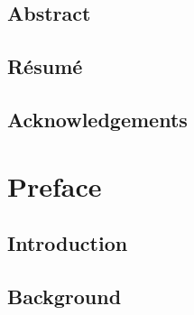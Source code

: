 \documentclass{style/umemoir}
\author{First Name LAST NAME} %
\begin{document}

\MyTitlePage

\frontmatter %








\chapter*{Abstract}


\chapter*{R\'esum\'e}



\chapter*{Acknowledgements}



\cleardoublepage
\setcounter{tocdepth}{1}
\tableofcontents
{}


\mainmatter %

\part{Preface}
\label{part:preface}


\chapter{Introduction}
\label{chapter:introduction}



\chapter{Background}
\label{chapter:background}
%
\end{document}
